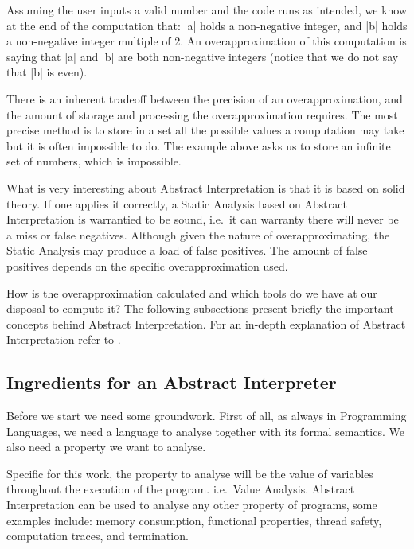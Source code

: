 Assuming the user inputs a valid number and the code runs as intended,
we know at the end of the computation that: \pycode|a| holds a
non-negative integer, and \pycode|b| holds a non-negative integer
multiple of 2. An overapproximation of this computation is saying that
\pycode|a| and \pycode|b| are both non-negative integers (notice that we
do not say that \pycode|b| is even).

There is an inherent tradeoff between the precision of an
overapproximation, and the amount of storage and processing the
overapproximation requires. The most precise method is to store in a set
all the possible values a computation may take but it is often
impossible to do. The example above asks us to store an infinite set of
numbers, which is impossible.

What is very interesting about Abstract Interpretation is that it is
based on solid theory. If one applies it correctly, a Static Analysis
based on Abstract Interpretation is warrantied to be sound, i.e.~it can
warranty there will never be a miss or false negatives. Although given
the nature of overapproximating, the Static Analysis may produce a load
of false positives. The amount of false positives depends on the
specific overapproximation used.

How is the overapproximation calculated and which tools do we have at
our disposal to compute it? The following subsections present briefly
the important concepts behind Abstract Interpretation. For an in-depth
explanation of Abstract Interpretation refer to
\autocites[Chapters 1 and 4]{nielson2015principles}%
{cousot_abstract_1977}%
{nipkow_abstract_2014}.

\subsection{Ingredients for an Abstract Interpreter}
\label{ingredients-for-an-abstract-interpreter}

Before we start we need some groundwork. First of all, as always in
Programming Languages, we need a language to analyse together with its
formal semantics. We also need a property we want to analyse.

Specific for this work, the property to analyse will be the value of
variables throughout the execution of the program. i.e.~Value Analysis.
Abstract Interpretation can be used to analyse any other property of
programs, some examples include: memory consumption, functional
properties, thread safety, computation traces, and termination.


